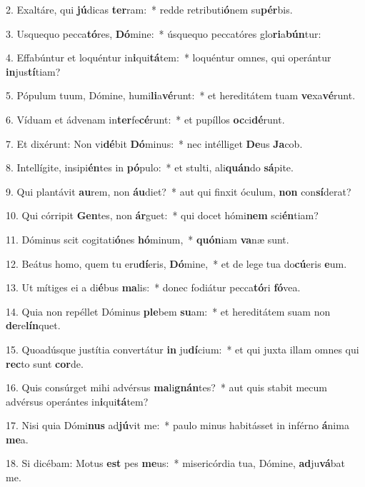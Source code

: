 2. Exaltáre, qui \textbf{jú}dicas \textbf{ter}ram:~*  redde retributi\textbf{ó}nem su\textbf{pér}bis.\

3. Usquequo pecca\textbf{tó}res, \textbf{Dó}mine:~*  úsquequo peccatóres glo\textbf{ri}a\textbf{bún}tur:\

4. Effabúntur et loquéntur in\textbf{i}qui\textbf{tá}tem:~*  loquéntur omnes, qui operántur \textbf{in}jus\textbf{tí}tiam?\

5. Pópulum tuum, Dómine, humi\textbf{li}a\textbf{vé}runt:~*  et hereditátem tuam \textbf{ve}xa\textbf{vé}runt.\

6. Víduam et ádvenam in\textbf{ter}fe\textbf{cé}runt:~*  et pupíllos \textbf{oc}ci\textbf{dé}runt.\

7. Et dixérunt: Non vi\textbf{dé}bit \textbf{Dó}minus:~*  nec intélliget \textbf{De}us \textbf{Ja}cob.\

8. Intellígite, insipi\textbf{én}tes in \textbf{pó}pulo:~*  et stulti, ali\textbf{quán}do \textbf{sá}pite.\

9. Qui plantávit \textbf{au}rem, non \textbf{áu}diet?~*  aut qui finxit óculum, \textbf{non} con\textbf{sí}derat?\

10. Qui córripit \textbf{Gen}tes, non \textbf{ár}guet:~*  qui docet hómi\textbf{nem} sci\textbf{én}tiam?\

11. Dóminus scit cogitati\textbf{ó}nes \textbf{hó}minum,~*  \textbf{quón}iam \textbf{va}næ sunt.\

12. Beátus homo, quem tu eru\textbf{dí}eris, \textbf{Dó}mine,~*  et de lege tua do\textbf{cú}eris \textbf{e}um.\

13. Ut mítiges ei a di\textbf{é}bus \textbf{ma}lis:~*  donec fodiátur pecca\textbf{tó}ri \textbf{fó}vea.\

14. Quia non repéllet Dóminus \textbf{ple}bem \textbf{su}am:~*  et hereditátem suam non \textbf{de}re\textbf{lín}quet.\

15. Quoadúsque justítia convertátur \textbf{in} ju\textbf{dí}cium:~*  et qui juxta illam omnes qui \textbf{rec}to sunt \textbf{cor}de.\

16. Quis consúrget mihi advérsus \textbf{ma}li\textbf{gnán}tes?~*  aut quis stabit mecum advérsus operántes in\textbf{i}qui\textbf{tá}tem?\

17. Nisi quia Dómi\textbf{nus} ad\textbf{jú}vit me:~*  paulo minus habitásset in inférno \textbf{á}nima \textbf{me}a.\

18. Si dicébam: Motus \textbf{est} pes \textbf{me}us:~*  misericórdia tua, Dómine, \textbf{ad}ju\textbf{vá}bat me.\

